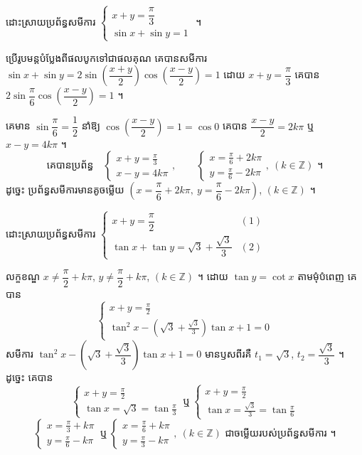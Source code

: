 \begin{example}[ឧទាហរណ៍ ១]
ដោះស្រាយប្រព័ន្ធសមីការ $\begin{cases} x + y = \dfrac{\pi}{3}\\ \sin x + \sin y = 1 \end{cases}$ ។

ប្រើរូបមន្តបំប្លែងពីផលបូកទៅជាផលគុណ គេបានសមីការ $\sin x + \sin y = 2\sin\left(\dfrac{x + y}{2}\right)\cos\left(\dfrac{x - y}{2}\right) = 1$ ដោយ $x + y = \dfrac{\pi}{3}$ គេបាន $2\sin\dfrac{\pi}{6}\cos\left(\dfrac{x - y}{2}\right) = 1$ ។

គេមាន $\sin\dfrac{\pi}{6} = \dfrac{1}{2}$ នាំឱ្យ $\cos\left(\dfrac{x - y}{2}\right) = 1 = \cos 0$ គេបាន $\dfrac{x - y}{2} = 2k\pi$ ឬ $x - y = 4k\pi$ ។
\[ \text{គេបានប្រព័ន្ធ} \quad \begin{cases} x + y = \frac{\pi}{3}\\ x - y = 4k\pi \end{cases}, \qquad \begin{cases} x = \frac{\pi}{6} + 2k\pi\\ y = \frac{\pi}{6} - 2k\pi \end{cases}, \ (k \in \mathbb{Z}) \text{ ។} \]
ដូច្នេះ ប្រព័ន្ធសមីការមានគូចម្លើយ $\left(x = \dfrac{\pi}{6} + 2k\pi, \ y = \dfrac{\pi}{6} - 2k\pi\right)$, $(k \in \mathbb{Z})$ ។
\end{example}

\begin{example}[ឧទាហរណ៍ ២]
ដោះស្រាយប្រព័ន្ធសមីការ $\begin{cases} x + y = \dfrac{\pi}{2} & (1)\\ \tan x + \tan y = \sqrt{3} + \dfrac{\sqrt{3}}{3} & (2) \end{cases}$

លក្ខខណ្ឌ $x \ne \dfrac{\pi}{2} + k\pi$, $y \ne \dfrac{\pi}{2} + k\pi$, $(k \in \mathbb{Z})$ ។ ដោយ $\tan y = \cot x$ តាមមុំបំពេញ គេបាន
\[ \begin{cases} x + y = \frac{\pi}{2}\\ \tan^2 x - \left(\sqrt{3} + \frac{\sqrt{3}}{3}\right)\tan x + 1 = 0 \end{cases} \]
សមីការ $\tan^2 x - \left(\sqrt{3} + \dfrac{\sqrt{3}}{3}\right)\tan x + 1 = 0$ មានឫសពីរគឺ $t_1 = \sqrt{3}$, $t_2 = \dfrac{\sqrt{3}}{3}$ ។ ដូច្នេះ គេបាន
\[ \begin{cases} x + y = \frac{\pi}{2}\\ \tan x = \sqrt{3} = \tan\frac{\pi}{3} \end{cases} \ \text{ឬ} \ \begin{cases} x + y = \frac{\pi}{2}\\ \tan x = \frac{\sqrt{3}}{3} = \tan\frac{\pi}{6} \end{cases} \]
\[ \begin{cases} x = \frac{\pi}{3} + k\pi\\ y = \frac{\pi}{6} - k\pi \end{cases} \ \text{ឬ} \ \begin{cases} x = \frac{\pi}{6} + k\pi\\ y = \frac{\pi}{3} - k\pi \end{cases}, \ (k \in \mathbb{Z}) \text{ ជាចម្លើយរបស់ប្រព័ន្ធសមីការ ។} \]
\end{example}

